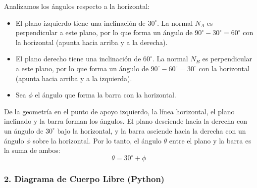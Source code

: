 \documentclass[12pt, a4paper]{article}
\begin{document}
Analizamos los ángulos respecto a la horizontal:
\begin{itemize}
    \item El plano izquierdo tiene una inclinación de $30^\circ$. La normal $N_A$ es perpendicular a este plano, por lo que forma un ángulo de $90^\circ - 30^\circ = 60^\circ$ con la horizontal (apunta hacia arriba y a la derecha).
    \item El plano derecho tiene una inclinación de $60^\circ$. La normal $N_B$ es perpendicular a este plano, por lo que forma un ángulo de $90^\circ - 60^\circ = 30^\circ$ con la horizontal (apunta hacia arriba y a la izquierda).
    \item Sea $\phi$ el ángulo que forma la barra con la horizontal.
\end{itemize}

De la geometría en el punto de apoyo izquierdo, la línea horizontal, el plano inclinado y la barra forman los ángulos. El plano desciende hacia la derecha con un ángulo de $30^\circ$ bajo la horizontal, y la barra asciende hacia la derecha con un ángulo $\phi$ sobre la horizontal. 
Por lo tanto, el ángulo $\theta$ entre el plano y la barra es la suma de ambos:
$$\theta = 30^\circ + \phi$$

\subsubsection*{2. Diagrama de Cuerpo Libre (Python)}
\end{document}
